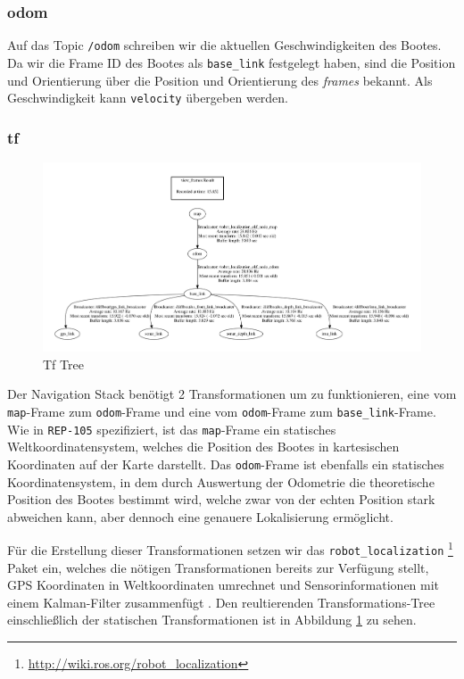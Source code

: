 \documentclass[11pt]{article}
\begin{document}
\subsubsection{odom}
Auf das Topic \texttt{/odom} schreiben wir die aktuellen Geschwindigkeiten des Bootes. Da wir die Frame ID des Bootes als \texttt{base\_link} festgelegt haben, sind die Position und Orientierung über die Position und Orientierung des \textit{frames} bekannt. Als Geschwindigkeit kann \texttt{velocity} übergeben werden.

\subsubsection{tf}

\begin{figure}[h]
	\includegraphics[width=\linewidth]{frames.png}
	\caption{Tf Tree}
	\label{frames}
\end{figure}

Der Navigation Stack benötigt 2 Transformationen um zu funktionieren, eine vom \texttt{map}-Frame zum \texttt{odom}-Frame und eine vom \texttt{odom}-Frame zum \texttt{base\_link}-Frame. Wie in \texttt{REP-105} \cite{REP105} spezifiziert, ist das \texttt{map}-Frame ein statisches Weltkoordinatensystem, welches die Position des Bootes in kartesischen Koordinaten auf der Karte darstellt.  Das \texttt{odom}-Frame ist ebenfalls ein statisches Koordinatensystem, in dem durch Auswertung der Odometrie die theoretische Position des Bootes bestimmt wird, welche zwar von der echten Position stark abweichen kann, aber dennoch eine genauere Lokalisierung ermöglicht.

Für die Erstellung dieser Transformationen setzen wir das \texttt{robot\_localization} \footnote{\url{http://wiki.ros.org/robot_localization}} Paket ein, welches die nötigen Transformationen bereits zur Verfügung stellt, GPS Koordinaten in Weltkoordinaten umrechnet und Sensorinformationen mit einem Kalman-Filter zusammenfügt \cite{MooreStouchKeneralizedEkf2014}. Den reultierenden Transformations-Tree einschließlich der statischen Transformationen ist in Abbildung \ref{frames} zu sehen.\\
\end{document}
